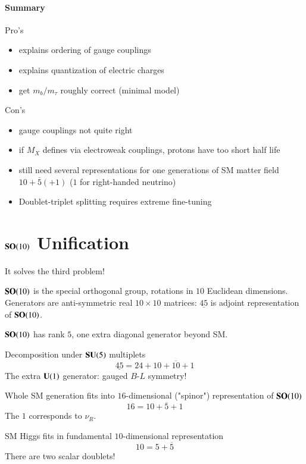 \paragraph{Summary} 

Pro's
\begin{itemize}
   \item explains ordering of gauge couplings
   \item explains quantization of electric charges
   \item get $m_b / m_\tau$ roughly correct (minimal model)
\end{itemize}
Con's
\begin{itemize}
   \item gauge couplings not quite right
   \item if $M_X$ defines via electroweak couplings, protons have too short half life
   \item still need several representations for one generations of SM matter field $10 + \overline{5} (+1)$ ($1$ for right-handed neutrino)
   \item Doublet-triplet splitting requires extreme fine-tuning
\end{itemize}

\section{$\mathbf{SO}(10)$ Unification} 
It solves the third problem!

$\mathbf{SO}(10)$ is the special orthogonal group, rotations in $10$ Euclidean dimensions. Generators are anti-symmetric real $10\times 10$ matrices: $\underline{45}$ is adjoint representation of $\mathbf{SO}(10)$.

$\mathbf{SO}(10)$ has rank $5$, one extra diagonal generator beyond SM.

Decomposition under $\mathbf{SU}(5)$ multiplets
\begin{equation}
   \underline{45} = 24 + 10 + \overline{10} + 1 \label{2.51}
\end{equation}
The extra $\mathbf{U}(1)$ generator: gauged $B$-$L$ symmetry!

Whole SM generation fits into $16$-dimensional ("spinor") representation of $\mathbf{SO}(10)$
\begin{equation}
   16  = 10 + \overline{5} + 1 \label{2.51} 
\end{equation}
The $1$ corresponds to $\nu_R$.

SM Higgs fits in fundamental $10$-dimensional representation
\begin{equation}
   10 = 5 + \overline{5} \label{2.52}
\end{equation}
There are two scalar doublets!

